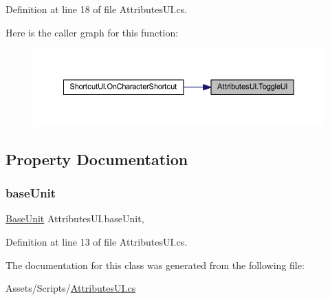 Definition at line 18 of file Attributes\+U\+I.\+cs.

Here is the caller graph for this function\+:
\nopagebreak
\begin{figure}[H]
\begin{center}
\leavevmode
\includegraphics[width=350pt]{class_attributes_u_i_a7cb7b0cebe1130576d6bbd279cb62ac1_icgraph}
\end{center}
\end{figure}


\subsection{Property Documentation}
\mbox{\label{class_attributes_u_i_a346e8b850f9b6c18b78fc7175d89bea7}} 
\subsubsection{\texorpdfstring{baseUnit}{baseUnit}}
{\footnotesize\ttfamily \mbox{\hyperlink{class_base_unit}{Base\+Unit}} Attributes\+U\+I.\+base\+Unit\hspace{0.3cm}{\ttfamily [get]}, {\ttfamily [set]}}



Definition at line 13 of file Attributes\+U\+I.\+cs.



The documentation for this class was generated from the following file\+:\begin{DoxyCompactItemize}
\item 
Assets/\+Scripts/\mbox{\hyperlink{_attributes_u_i_8cs}{Attributes\+U\+I.\+cs}}\end{DoxyCompactItemize}
